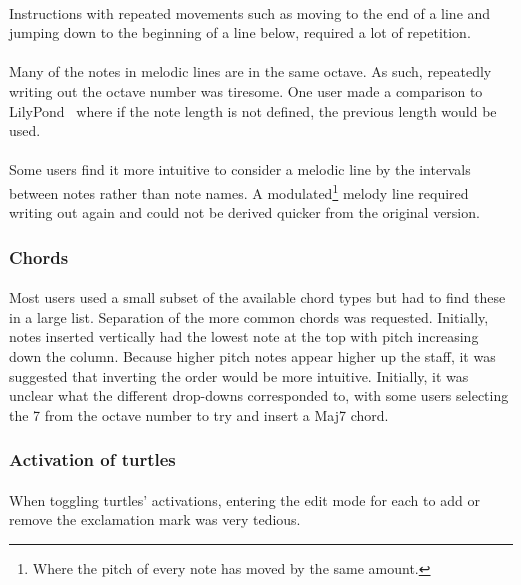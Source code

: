 \paragraph{} Instructions with repeated movements such as moving to the end of a line and jumping down to the beginning of a line below, required a lot of repetition.

\paragraph{} Many of the notes in melodic lines are in the same octave. As such, repeatedly writing out the octave number was tiresome. One user made a comparison to LilyPond~\cite{sandberg:lily} where if the note length is not defined, the previous length would be used.

\paragraph{} Some users find it more intuitive to consider a melodic line by the intervals between notes rather than note names. A modulated\footnote{Where the pitch of every note has moved by the same amount.} melody line required writing out again and could not be derived quicker from the original version.

\subsubsection{Chords}

\paragraph{} Most users used a small subset of the available chord types but had to find these in a large list. Separation of the more common chords was requested. Initially, notes inserted vertically  had the lowest note at the top with pitch increasing down the column. Because higher pitch notes appear higher up the staff, it was suggested that inverting the order would be more intuitive. Initially, it was unclear what the different drop-downs corresponded to, with some users selecting the 7 from the octave number to try and insert a Maj7 chord.

\subsubsection{Activation of turtles}

\paragraph{} When toggling turtles' activations, entering the edit mode for each to add or remove the exclamation mark was very tedious.


